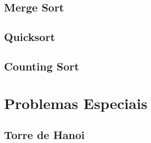 \subsection{Merge Sort}


\subsection{Quicksort}


\subsection{Counting Sort}


\section{Problemas Especiais}

\subsection{Torre de Hanoi}


% 

% 

% 

% 

